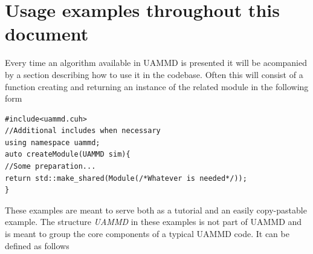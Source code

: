 \documentclass[ twoside,openright,titlepage,numbers=noenddot,%
headinclude,footinclude,cleardoublepage=empty,abstract=on,
BCOR=5mm,paper=a4,fontsize=11pt, dvipsnames
]{scrreprt}
\def\ucpp{uammd_cpp_lexer.py:UAMMDCppLexer -x}
\newcommand{\uammd}{\gls{UAMMD}\xspace}
\begin{document}
%

\chapter{Usage examples throughout this document}\label{sec:uammd_struct}
Every time an algorithm available in \uammd is presented it will be acompanied by a section describing how to use it in the codebase.
Often this will consist of a function creating and returning an instance of the related module in the following form


\begin{verbatim}
#include<uammd.cuh>
//Additional includes when necessary
using namespace uammd;
auto createModule(UAMMD sim){
//Some preparation...
return std::make_shared(Module(/*Whatever is needed*/));
}
\end{verbatim}

These examples are meant to serve both as a tutorial and an easily copy-pastable example.
The structure \emph{UAMMD} in these examples is not part of \uammd and is meant to group the core components of a typical \uammd code. It can be defined as follows
\end{document}
